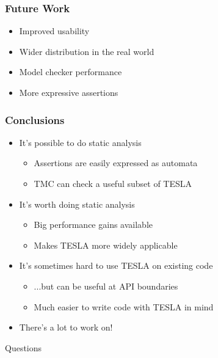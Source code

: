 \documentclass{beamer}
\begin{document}
\begin{frame}
  \frametitle{Future Work}

  \begin{itemize}
    \item Improved usability
    \item Wider distribution in the real world
    \item Model checker performance
    \item More expressive assertions
  \end{itemize}
\end{frame}

\begin{frame}
  \frametitle{Conclusions}

  \begin{itemize}
    \item It's possible to do static analysis
      \begin{itemize}
        \item Assertions are easily expressed as automata
        \item TMC can check a useful subset of TESLA
      \end{itemize}
    \item It's worth doing static analysis
      \begin{itemize}
        \item Big performance gains available
        \item Makes TESLA more widely applicable
      \end{itemize}
    \item It's sometimes hard to use TESLA on existing code
      \begin{itemize}
        \item ...but can be useful at API boundaries
        \item Much easier to write code with TESLA in mind
      \end{itemize}
    \item There's a lot to work on!
  \end{itemize}
\end{frame}

\begin{frame}[c]

  \begin{center}
  \Huge Questions
  \end{center}

\end{frame}
\end{document}
